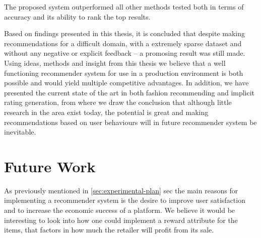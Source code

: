 The proposed system outperformed all other methods tested both in terms of
accuracy and its ability to rank the top results.


Based on findings presented in this thesis, it is concluded that despite making
recommendations for a difficult domain, with a extremely sparse dataset and
without any negative or explicit feedback -- a promosing result was still made.
Using ideas, methods and insight from this thesis we believe that a well
functioning recommender system for use in a production environment is both
possible and would yield multiple competitive advantages. In addition, we have
presented the current state of the art in both fashion recommending and
implicit rating generation, from where we draw the conclusion that although
little research in the area exist today, the potential is great and making
recommendations based on user behaviours will in future recommender system be
inevitable.

%

\section{Future Work}

As previously mentioned in \ref{sec:experimental-plan} sec the main reasons for
implementing a recommender system is the desire to improve user satisfaction
and to increase the economic success of a platform.  We believe it would be
interesting to look into how one could implement a reward attribute for the
items, that factors in how much the retailer will profit from its sale.

